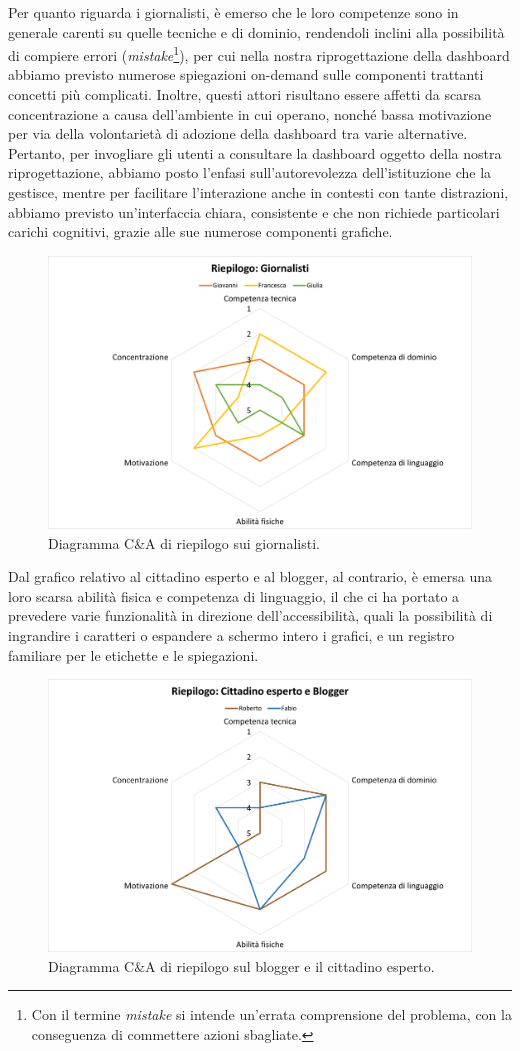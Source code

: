 \noindent
Per quanto riguarda i giornalisti, è emerso che le loro competenze sono in generale carenti su quelle tecniche e di dominio, rendendoli inclini alla possibilità di compiere errori (\textit{mistake}\footnote{Con il termine \textit{mistake} si intende un'errata comprensione del problema, con la conseguenza di commettere azioni sbagliate.}), per cui nella nostra riprogettazione della dashboard abbiamo previsto numerose spiegazioni on-demand sulle componenti trattanti concetti più complicati.
Inoltre, questi attori risultano essere affetti da scarsa concentrazione a causa dell'ambiente in cui operano, nonché bassa motivazione per via della volontarietà di adozione della dashboard tra varie alternative.
Pertanto, per invogliare gli utenti a consultare la dashboard oggetto della nostra riprogettazione, abbiamo posto l'enfasi sull'autorevolezza dell'istituzione che la gestisce, mentre per facilitare l'interazione anche in contesti con tante distrazioni, abbiamo previsto un'interfaccia chiara, consistente e che non richiede particolari carichi cognitivi, grazie alle sue numerose componenti grafiche.
\begin{figure}[!h]
    \centering
    \includegraphics[width=0.5\columnwidth]{assets/images/proposta-design/caos/riepilogo-giornalisti}
    \caption{Diagramma C\&A di riepilogo sui giornalisti.}
\end{figure}

\noindent
Dal grafico relativo al cittadino esperto e al blogger, al contrario, è emersa una loro scarsa abilità fisica e competenza di linguaggio, il che ci ha portato a prevedere varie funzionalità in direzione dell'accessibilità, quali la possibilità di ingrandire i caratteri o espandere a schermo intero i grafici, e un registro familiare per le etichette e le spiegazioni.
\begin{figure}[!h]
    \centering
    \includegraphics[width=0.5\columnwidth]{assets/images/proposta-design/caos/riepilogo-cittadini-altro}
    \caption{Diagramma C\&A di riepilogo sul blogger e il cittadino esperto.}
\end{figure}

